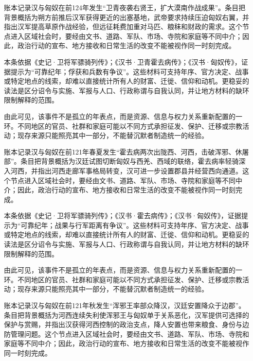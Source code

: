 账本记录汉与匈奴在前124年发生“卫青夜袭右贤王，扩大漠南作战成果”。条目把背景概括为朔方前推后汉军获得更近的出塞基地，武帝要求持续压迫匈奴右翼，并指出汉军提高草原作战经验，但远征耗费加重对马匹、粮秣和财政的需求。这个节点进入区域社会时，要经由文书、道路、军队、市场、寺院和家庭等不同中介；因此，政治行动的宣布、地方接收和日常生活的改变不能被视作同一时刻完成。

本条依据《史记·卫将军骠骑列传》；《汉书·卫青霍去病传》；《汉书·匈奴传》，证据提示为“可靠纪年；俘获和兵数有争议”。这些材料可支持年序、官方决定、战事或特定地点的线索，却难以直接统计所有人的财富、迁徙、信仰和动机。更稳妥的读法是区分诏令与实施、军报与人口、行政称谓与自我认同，并让地方材料的缺环限制解释的范围。

由此可见，该事件不是孤立的年表点，而是资源、信息与权力关系重新配置的一环。不同地区的官员、社群和家庭可能以不同方式承担征发、保护、迁移或宗教活动；现存来源只能照亮其中一部分，不能替沉默者制造统一的经验。

账本记录汉与匈奴在前121年春夏发生“霍去病两次出陇西、河西，击破浑邪、休屠部”。条目把背景概括为汉廷试图切断匈奴与西羌、西域的联络，霍去病率轻骑深入河西，并指出河西走廊军事格局转变，汉可进一步设置郡县并经营西向通道。这个节点进入区域社会时，要经由文书、道路、军队、市场、寺院和家庭等不同中介；因此，政治行动的宣布、地方接收和日常生活的改变不能被视作同一时刻完成。

本条依据《史记·卫将军骠骑列传》；《汉书·霍去病传》；《汉书·匈奴传》，证据提示为“可靠纪年；战果与行军距离有争议”。这些材料可支持年序、官方决定、战事或特定地点的线索，却难以直接统计所有人的财富、迁徙、信仰和动机。更稳妥的读法是区分诏令与实施、军报与人口、行政称谓与自我认同，并让地方材料的缺环限制解释的范围。

由此可见，该事件不是孤立的年表点，而是资源、信息与权力关系重新配置的一环。不同地区的官员、社群和家庭可能以不同方式承担征发、保护、迁移或宗教活动；现存来源只能照亮其中一部分，不能替沉默者制造统一的经验。

账本记录汉与匈奴在前121年秋发生“浑邪王率部众降汉，汉廷安置降众于边郡”。条目把背景概括为河西连续失利使浑邪王与匈奴单于关系恶化，汉军提供可选择的保护与赏赐，并指出汉获得河西控制的政治支点，降人安置也带来粮食、身份与边防管理问题。这个节点进入区域社会时，要经由文书、道路、军队、市场、寺院和家庭等不同中介；因此，政治行动的宣布、地方接收和日常生活的改变不能被视作同一时刻完成。

